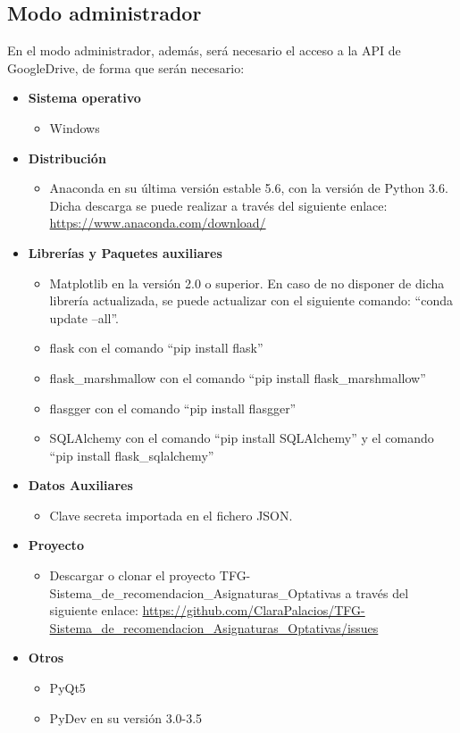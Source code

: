 \subsection{Modo administrador}
En el modo administrador, además, será necesario el acceso a la API de GoogleDrive, de forma que serán necesario: 
\begin{itemize}
\item \textbf{Sistema operativo}
\begin{itemize}
\item Windows
\end{itemize} 
\item \textbf{Distribución}
\begin{itemize}
\item Anaconda en su última versión estable 5.6, con la versión de Python 3.6. Dicha descarga se puede realizar a través del siguiente enlace: \url{https://www.anaconda.com/download/}
\end{itemize}
\item \textbf{Librerías y Paquetes auxiliares}
\begin{itemize}
\item Matplotlib en la versión 2.0 o superior.  En caso de no disponer de dicha librería actualizada, se puede actualizar con el siguiente comando: ``conda update --all''.
\item flask con el comando ``pip install flask''
\item flask\_marshmallow con el comando ``pip install flask\_marshmallow''
\item flasgger con el comando ``pip install flasgger''
\item SQLAlchemy con el comando ``pip install SQLAlchemy'' y el comando ``pip install flask\_sqlalchemy''
\end{itemize}
\item \textbf{Datos Auxiliares}
\begin{itemize}
\item Clave secreta importada en el fichero JSON. 
\end{itemize}
\item \textbf{Proyecto}
\begin{itemize}
\item Descargar o clonar el proyecto TFG-Sistema\_de\_recomendacion\_Asignaturas\_Optativas a través del siguiente enlace: \url{https://github.com/ClaraPalacios/TFG-Sistema_de_recomendacion_Asignaturas_Optativas/issues}
\end{itemize}
\item \textbf{Otros}
\begin{itemize}
\item PyQt5
\item PyDev en su versión 3.0-3.5
\end{itemize}
\end{itemize}

